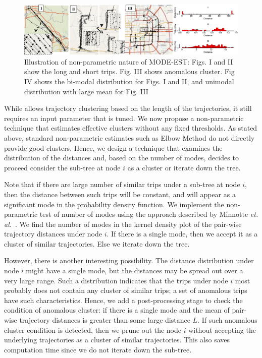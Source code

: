 \paragraph{\modal}
\begin{figure}
\centering
\includegraphics[scale=0.6]{figs/hist_full.eps}
\caption{Illustration of non-parametric nature of MODE-EST: Figs. I and II show the long and short trips. Fig. III shows anomalous cluster. Fig IV shows the bi-modal distribution for Figs. I and II, and unimodal distribution with large mean for Fig. III}
\label{fig:anom}
\end{figure}

While \lthAware allows trajectory clustering based on the length of the trajectories, it still requires an input parameter that is tuned. We now propose a non-parametric technique that estimates effective clusters without any fixed thresholds. As stated above, standard non-parametric estimates such as Elbow Method do not directly provide good clusters. Hence, we design a technique that examines the distribution of the distances and, based on the number of modes, decides to proceed consider the sub-tree at node $i$ as a cluster or iterate down the tree.

Note that if there are large number of similar trips under a sub-tree at node $i$, then the distance between such trips will be constant, and will appear as a significant mode in the probability density function. We implement the non-parametric test of number of modes using the approach described by Minnotte \textit{et. al.}~\cite{minnotte}. We find the number of modes in the kernel density plot of the pair-wise trajectory distances under node $i$. If there is a single mode, then we accept it as a  cluster of similar trajectories. Else we iterate down the tree. 

However, there is another interesting possibility. The distance distribution under node $i$ might have a single mode, but the distances may be spread out over a very large range. Such a distribution indicates that the trips under node $i$ most probably does not contain any cluster of similar trips; a set of anomalous trips have such characteristics. Hence, we add a post-processing stage to check the condition of anomalous cluster: if there is a single mode and the mean of pair-wise trajectory distances is greater than some large distance $L$. If such anomalous cluster condition is detected, then we prune out the node $i$ without accepting the underlying trajectories as a cluster of similar trajectories. This also saves computation time since we do not iterate down the sub-tree.

